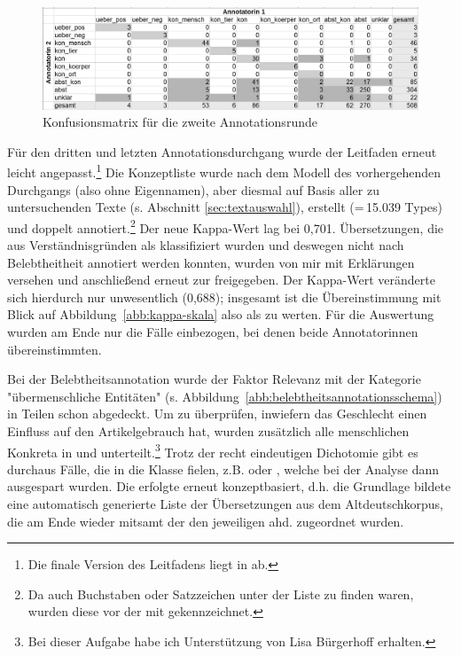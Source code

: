 \begin{figure}
\begin{center}
  \includegraphics[width=12 cm]{images/confusionsmatrix-neu-sw.jpg}
\caption {Konfusionsmatrix für die zweite Annotationsrunde}
\label{abb:confusion}
\end{center}
\end{figure} 

Für den dritten und letzten Annotationsdurchgang  wurde der Leitfaden erneut leicht angepasst.\footnote{Die finale Version des Leitfadens liegt in \textcite{HZKYL4_2020} ab.} Die Konzeptliste wurde nach dem Modell des vorhergehenden Durchgangs (also ohne Eigennamen), aber diesmal auf Basis aller zu untersuchenden Texte (s. Abschnitt \ref{sec:textauswahl}), erstellt (=\,15.039 Types)  und doppelt  annotiert.\footnote{Da auch Buchstaben oder Satzzeichen unter der Liste zu finden waren, wurden diese vor der  mit  gekennzeichnet.} Der neue Kappa-Wert lag bei 0,701. Übersetzungen, die aus Verständnisgründen als  klassifiziert wurden und deswegen nicht nach Belebtheitheit annotiert  werden konnten, wurden von mir mit Erklärungen versehen und anschließend erneut zur  freigegeben. Der Kappa-Wert veränderte sich hierdurch nur unwesentlich (0,688); insgesamt ist die Übereinstimmung mit Blick auf Abbildung~\ref{abb:kappa-skala} also als   zu werten. Für die Auswertung wurden am Ende nur die Fälle einbezogen, bei denen beide Annotatorinnen übereinstimmten.


Bei der Belebtheitsannotation  wurde der Faktor Relevanz mit der Kategorie "übermenschliche Entitäten" (s. Abbildung~\ref{abb:belebtheitsannotationsschema}) in Teilen schon abgedeckt. Um zu überprüfen, inwiefern das Geschlecht einen Einfluss auf den Artikelgebrauch hat, wurden zusätzlich alle menschlichen Konkreta in  und  unterteilt.\footnote{Bei dieser Aufgabe habe ich Unterstützung von Lisa Bürgerhoff erhalten.} 
Trotz der recht eindeutigen Dichotomie gibt es durchaus Fälle, die in die Klasse  fielen, z.B.  oder , welche bei der Analyse dann ausgespart wurden.  Die  erfolgte erneut konzeptbasiert, d.h. die Grundlage bildete eine automatisch generierte Liste der  Übersetzungen aus dem  Altdeutschkorpus, die am Ende wieder mitsamt der   den jeweiligen ahd.  zugeordnet wurden. 

